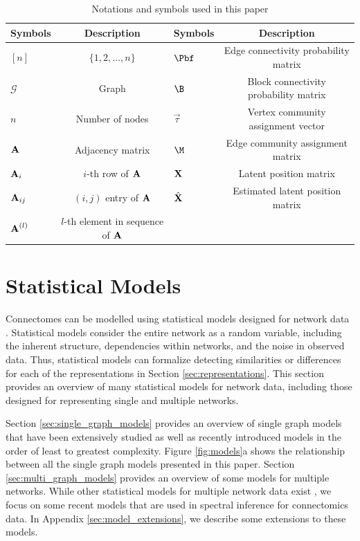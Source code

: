 \begin{table}
\caption{Notations and symbols used in this paper}\label{tab1}
\begin{center}
\begin{tabular}{|@{}l|c@{}|@{}l|c@{}|}
\hline
Symbols & Description & Symbols & Description\\
\hline
$[n]$ & $\{1, 2, \ldots, n\}$ & $\Pbf$ & Edge connectivity probability matrix\\
$\mathcal{G}$ & Graph & $\B$ & Block connectivity probability matrix\\
$n$ & Number of nodes & $\vec{\tau}$ & Vertex community assignment vector\\
$\operatorname{\mathbf{A}}$ & Adjacency matrix & $\M$ & Edge community assignment matrix\\
$\operatorname{\mathbf{A}}_i$ & $i$-th row of $\operatorname{\mathbf{A}}$ & $\operatorname{\mathbf{X}}$ & Latent position matrix\\
$\operatorname{\mathbf{A}}_{ij}$ & $(i,j)$ entry of $\operatorname{\mathbf{A}}$ & $\hat{\operatorname{\mathbf{X}}}$ & Estimated latent position matrix\\
$\operatorname{\mathbf{A}}^{(l)}$ & $l$-th element in sequence of $\operatorname{\mathbf{A}}$ & &\\
\hline
\end{tabular}
\end{center}
\end{table}

\section{Statistical Models}\label{sec:models}
Connectomes can be modelled using statistical models designed for network data \citep{goldenberg2010survey, kolaczyk2014statistical}. Statistical models consider the entire network as a random variable, including the inherent structure, dependencies within networks, and the noise in observed data. 
Thus, statistical models can formalize detecting similarities or differences for each of the representations in Section \ref{sec:representations}.
This section provides an overview of many statistical models for network data, including those designed for representing single and multiple networks. 

Section \ref{sec:single_graph_models} provides an overview of single graph models that have been extensively studied as well as recently introduced models in the order of least to greatest complexity. Figure \ref{fig:models}a shows the relationship between all the single graph models presented in this paper. Section \ref{sec:multi_graph_models} provides an overview of some models for multiple networks. While other statistical models for multiple network data exist \citep{zhang2018network, wang2019joint, nielsen2018multiple, Durante2017-fz}, we focus on  some recent models that are used in spectral inference for connectomics data. In Appendix \ref{sec:model_extensions}, we describe some extensions to these models. 

